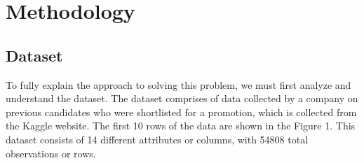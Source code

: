 \documentclass[
]{article}
\begin{document}
\hypertarget{methodology}{%
\section{Methodology}\label{methodology}}

\hypertarget{dataset}{%
\subsection{Dataset}\label{dataset}}

To fully explain the approach to solving this problem, we must first
analyze and understand the dataset. The dataset comprises of data
collected by a company on previous candidates who were shortlisted for a
promotion, which is collected from the Kaggle website. The first 10 rows
of the data are shown in the Figure 1. This dataset consists of 14
different attributes or columns, with 54808 total observations or rows.
\end{document}
